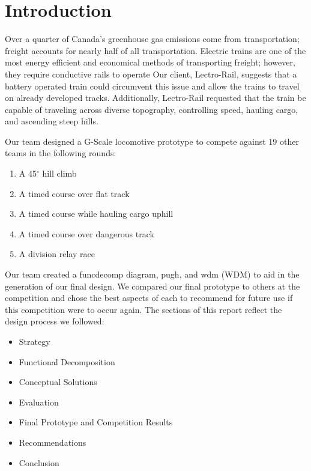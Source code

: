\documentclass[class=../report, crop=false]{standalone}
\begin{document}
\section{Introduction}

Over a quarter of Canada’s greenhouse gas emissions come from transportation; freight accounts for nearly half of all transportation.
Electric trains are one of the most energy efficient and economical methods of transporting freight; however, they require conductive rails to operate \parencite{railrider}
Our client, Lectro-Rail, suggests that a battery operated train could circumvent this issue and allow the trains to travel on already developed tracks.
Additionally, Lectro-Rail requested that the train be capable of traveling across diverse topography, controlling speed, hauling cargo, and ascending steep hills.

Our team designed a G-Scale locomotive prototype to compete against 19 other teams in the following rounds:

\begin{enumerate}
	\item A 45$^{\circ}$ hill climb
	\item A timed course over flat track
	\item A timed course while hauling cargo uphill
	\item A timed course over dangerous track
	\item A division relay race
\end{enumerate}

Our team created a \gls{funcdecomp} diagram, \gls{pugh}, and \gls{wdm} (WDM) to aid in the generation of our final design.
We compared our final prototype to others at the competition and chose the best aspects of each to recommend for future use if this competition were to occur again.
The sections of this report reflect the design process we followed:

\begin{itemize}
	\item Strategy
	\item Functional Decomposition
	\item Conceptual Solutions
	\item Evaluation
	\item Final Prototype and Competition Results
	\item Recommendations
	\item Conclusion
\end{itemize}
\end{document}
